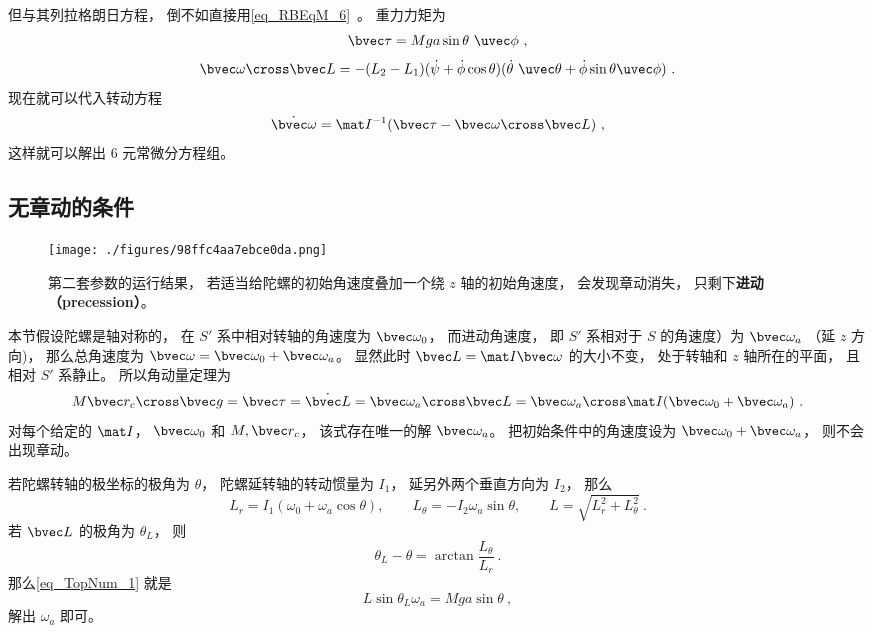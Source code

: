 但与其列拉格朗日方程， 倒不如直接用\autoref{eq_RBEqM_6}~。 重力力矩为
\begin{equation}
\bvec\tau = Mga\sin\theta\ \uvec\phi~,
\end{equation}
\begin{equation}
\bvec\omega\cross\bvec L = -(L_2-L_1)(\dot\psi + \dot\phi\cos\theta)(\dot\theta\ \uvec\theta  + \dot\phi\sin\theta\uvec\phi)~.
\end{equation}
现在就可以代入转动方程
\begin{equation}
\dot{\bvec\omega} = \mat I^{-1}(\bvec\tau - \bvec\omega\cross\bvec L)~,
\end{equation}
这样就可以解出 6 元常微分方程组。

\subsection{无章动的条件}

\begin{figure}[ht]
\centering
\texttt{[image: ./figures/98ffc4aa7ebce0da.png]}
\caption{第二套参数的运行结果， 若适当给陀螺的初始角速度叠加一个绕 $z$ 轴的初始角速度， 会发现章动消失， 只剩下\textbf{进动（precession）}。} \label{fig_TopNum_2}
\end{figure}

本节假设陀螺是轴对称的， 在 $S'$ 系中相对转轴的角速度为 $\bvec\omega_0$， 而进动角速度， 即 $S'$ 系相对于 $S$ 的角速度）为 $\bvec\omega_a$ （延 $z$ 方向)， 那么总角速度为 $\bvec\omega = \bvec\omega_0 + \bvec\omega_a$。 显然此时 $\bvec L = \mat I \bvec\omega$ 的大小不变， 处于转轴和 $z$ 轴所在的平面， 且相对 $S'$ 系静止。 所以角动量定理为
\begin{equation}\label{eq_TopNum_1}
M\bvec r_c\cross \bvec g = \bvec\tau = \dot{\bvec L} = \bvec\omega_a\cross\bvec L = \bvec\omega_a\cross \mat I (\bvec\omega_0 + \bvec\omega_a)~.
\end{equation}
对每个给定的 $\mat I$， $\bvec\omega_0$ 和 $M, \bvec r_c$， 该式存在唯一的解 $\bvec\omega_a$。 把初始条件中的角速度设为 $\bvec\omega_0 + \bvec\omega_a$， 则不会出现章动。

若陀螺转轴的极坐标的极角为 $\theta$， 陀螺延转轴的转动惯量为 $I_1$， 延另外两个垂直方向为 $I_2$， 那么
\begin{equation}
L_r = I_1(\omega_0+\omega_a\cos\theta), \qquad
L_\theta = -I_2\omega_a\sin\theta, \qquad
L = \sqrt{L_r^2 + L_\theta^2}~.
\end{equation}
若 $\bvec L$ 的极角为 $\theta_L$， 则
\begin{equation}
\theta_L - \theta = \arctan\frac{L_\theta}{L_r}~.
\end{equation}
那么\autoref{eq_TopNum_1} 就是
\begin{equation}
L\sin\theta_L \omega_a = Mga\sin\theta~,
\end{equation}
解出 $\omega_a$ 即可。

